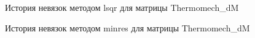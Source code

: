 \begin{figure}[H]
    \renewcommand{\figurename}{Рисунок}
    \caption{История невязок методом lsqr для матрицы Thermomech_dM}
    \label{fig:image_27}
\end{figure}

\begin{figure}[H]
    \renewcommand{\figurename}{Рисунок}
    \caption{История невязок методом minres для матрицы Thermomech_dM}
    \label{fig:image_28}
\end{figure}

